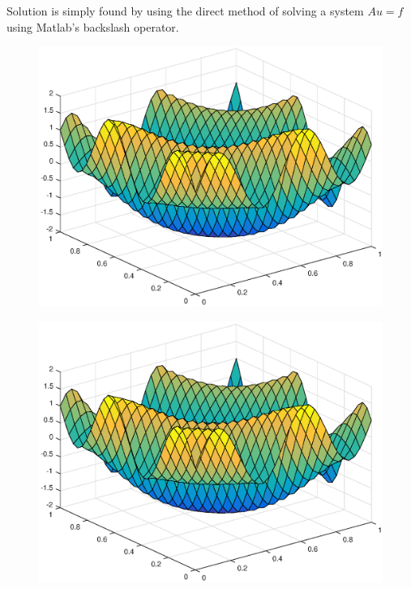 \documentclass[main.tex]{subfiles}
\begin{document}
Solution is simply found by using the direct method of solving a system $A u = f$ using Matlab's backslash operator.

\begin{figure}[h]
\centering
\begin{minipage}{.3\textwidth}
  \centering
  \includegraphics[width=.9\linewidth]{../Figures/ex2u0exact}
  \label{fig:ex2:u0exact}
\end{minipage}\hfill%
\begin{minipage}{.3\textwidth}
  \centering
  \includegraphics[width=.9\linewidth]{../Figures/ex2u0calc}
  \label{fig:ex2:u0calc}
\end{minipage}\hfill%
\begin{minipage}{.3\textwidth}

\end{minipage}
\end{figure}
\end{document}
